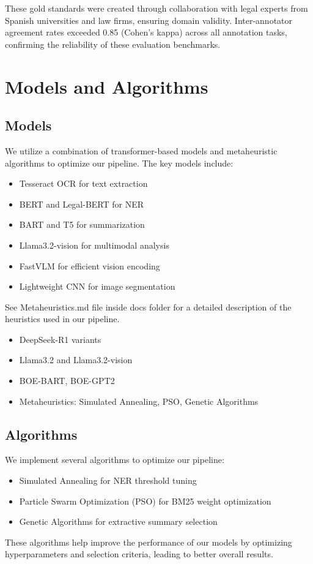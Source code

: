 \documentclass[conference]{IEEEtran}
\begin{document}
These gold standards were created through collaboration with legal experts from Spanish universities and law firms, ensuring domain validity. Inter-annotator agreement rates exceeded 0.85 (Cohen's kappa) across all annotation tasks, confirming the reliability of these evaluation benchmarks.

\section{Models and Algorithms}
\subsection{Models}
We utilize a combination of transformer-based models and metaheuristic algorithms to optimize our pipeline. The key models include:
\begin{itemize}
    \item Tesseract OCR for text extraction
    \item BERT and Legal-BERT for NER
    \item BART and T5 for summarization
    \item Llama3.2-vision for multimodal analysis
    \item FastVLM for efficient vision encoding
    \item Lightweight CNN for image segmentation
\end{itemize}
See Metaheuristics.md file inside docs folder for a detailed description of the heuristics used in our pipeline.
\begin{itemize}
    \item DeepSeek-R1 variants
    \item Llama3.2 and Llama3.2-vision
    \item BOE-BART, BOE-GPT2
    \item Metaheuristics: Simulated Annealing, PSO, Genetic Algorithms
\end{itemize}

\subsection{Algorithms}
We implement several algorithms to optimize our pipeline:
\begin{itemize}
    \item Simulated Annealing for NER threshold tuning
    \item Particle Swarm Optimization (PSO) for BM25 weight optimization
    \item Genetic Algorithms for extractive summary selection
\end{itemize}
These algorithms help improve the performance of our models by optimizing hyperparameters and selection criteria, leading to better overall results.
\end{document}
